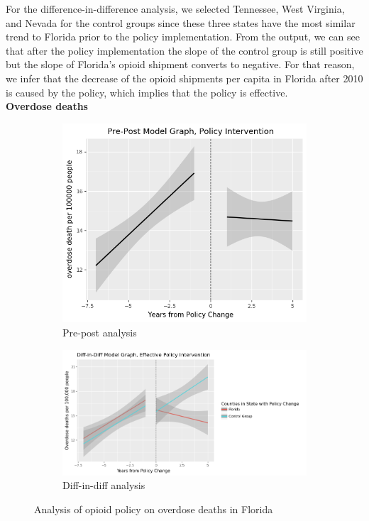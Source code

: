 \documentclass[12pt,letterpaper]{article}
\begin{document}
For the difference-in-difference analysis, we selected Tennessee, West Virginia, and Nevada for the control groups since these three states have the most similar trend to Florida prior to the policy implementation. From the output, we can see that after the policy implementation the slope of the control group is still positive but the slope of Florida's opioid shipment converts to negative. For that reason, we infer that the decrease of the opioid shipments per capita in Florida after 2010 is caused by the policy, which implies that the policy is effective. \\

\noindent \textbf{Overdose deaths} \\

\begin{figure}[!h]
\centering
\begin{subfigure}{.5\textwidth}
  \centering
  \includegraphics[width=0.7\linewidth]{../30_results/General_Results/florida_overdose_death_prepost.png}
  \caption{Pre-post analysis}
  \label{fig:fl_death_prepost}
\end{subfigure}%
\begin{subfigure}{.55\textwidth}
  \centering
  \includegraphics[width=1\linewidth]{../30_results/General_Results/florida_overdose_death_diffdiff.png}
  \caption{Diff-in-diff analysis}
  \label{fig:fl_death_did}
\end{subfigure}
\caption{Analysis of opioid policy on overdose deaths in Florida}
\label{fig:fl_death}
\end{figure}
\end{document}
